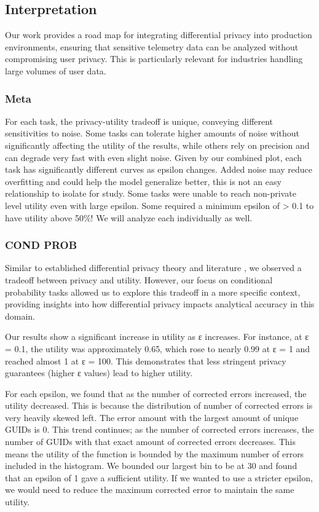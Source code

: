 \documentclass[12pt,letterpaper]{article}
\begin{document}
\subsection{Interpretation}
Our work provides a road map for integrating differential privacy into production environments, ensuring that sensitive telemetry data can be analyzed without compromising user privacy. This is particularly relevant for industries handling large volumes of user data. 

\subsubsection{Meta}
For each task, the privacy-utility tradeoff is unique, conveying different sensitivities to noise. Some tasks can tolerate higher amounts of noise without significantly affecting the utility of the results, while others rely on precision and can degrade very fast with even slight noise. Given by our combined plot, each task has significantly different curves as epsilon changes. Added noise may reduce overfitting and could help the model generalize better, this is not an easy relationship to isolate for study. Some tasks were unable to reach non-private level utility even with large epsilon. Some required a minimum epsilon of > 0.1 to have utility above 50\%! We will analyze each individually as well.

\subsubsection{COND PROB}
Similar to established differential privacy theory and literature \cite{DworkRoth}, we observed a tradeoff between privacy and utility. However, our focus on conditional probability tasks allowed us to explore this tradeoff in a more specific context, providing insights into how differential privacy impacts analytical accuracy in this domain.

Our results show a significant increase in utility as ε increases. For instance, at ε = 0.1, the utility was approximately 0.65, which rose to nearly 0.99 at ε = 1 and reached almost 1 at ε = 100. This demonstrates that less stringent privacy guarantees (higher ε values) lead to higher utility.

For each epsilon, we found that as the number of corrected errors increased, the utility decreased. This is because the distribution of number of corrected errors is very heavily skewed left. The error amount with the largest amount of unique GUIDs is 0. This trend continues; as the number of corrected errors increases, the number of GUIDs with that exact amount of corrected errors decreases. This means the utility of the function is bounded by the maximum number of errors included in the histogram. We bounded our largest bin to be at 30 and found that an epsilon of 1 gave a sufficient utility. If we wanted to use a stricter epsilon, we would need to reduce the maximum corrected error to maintain the same utility. 
\end{document}
